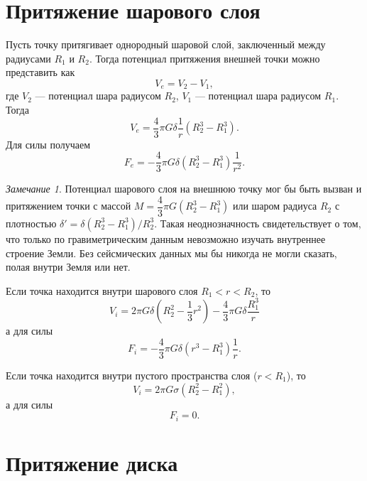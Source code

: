 \documentclass[11pt, a4paper]{article}
\theoremstyle{plain}
\theoremstyle{definition}
\theoremstyle{remark}
\newtheorem{remark}{Замечание}
\begin{document}
\section{Притяжение шарового слоя}
Пусть точку притягивает однородный шаровой слой, заключенный между радиусами $R_1$ и $R_2$. Тогда
потенциал притяжения внешней точки можно представить как
\begin{equation*}
    V_e = V_{2} - V_{1},
\end{equation*}
где $V_2$ --- потенциал шара радиусом $R_2$, $V_1$ --- потенциал шара радиусом $R_1$. Тогда
\begin{equation*}
    V_e = \dfrac{4}{3}\pi G\delta \dfrac{1}{r} \left( R_2^3 - R_1^3 \right).
\end{equation*}
Для силы получаем
\begin{equation*}
    F_e = -\dfrac{4}{3} \pi G\delta\left( R_2^3 - R_1^3 \right)\dfrac{1}{r^2}.
\end{equation*}
\begin{remark}
    Потенциал шарового слоя на внешнюю точку мог бы быть вызван и притяжением точки с массой
    $M = \dfrac{4}{3}\pi G\left( R_2^3 - R_1^3 \right)$ или шаром радиуса $R_2$ с плотностью 
    $\delta' = \delta\left( R_2^3 - R_1^3 \right) / R_2^3$. Такая неоднозначность свидетельствует о
    том, что только по гравиметрическим данным невозможно изучать внутреннее строение Земли.
    Без сейсмических данных мы бы никогда не могли сказать, полая внутри Земля или нет.
\end{remark}
Если точка находится внутри шарового слоя $R_1 < r < R_2$, то
\begin{equation*}
    V_i = 2\pi G\delta \left( R_2^2 - \dfrac{1}{3}r^2 \right) - \dfrac{4}{3}\pi G\delta\dfrac{R_1^3}{r}
\end{equation*}
а для силы
\begin{equation*}
    F_i = -\dfrac{4}{3}\pi G\delta \left( r^3 - R_1^3 \right) \dfrac{1}{r}.
\end{equation*}

Если точка находится внутри пустого пространства слоя ($r < R_1$), то
\begin{equation*}
    V_i = 2\pi G\sigma \left( R_2^2 - R_1^2 \right),
\end{equation*}
а для силы
\begin{equation*}
    F_i = 0.
\end{equation*}

\section{Притяжение диска}
\end{document}
